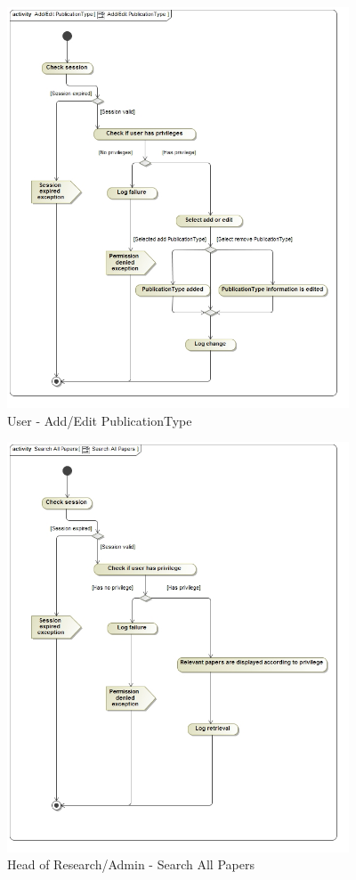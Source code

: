 \documentclass{article}
\begin{document}
			\begin{figure}[H]
				\includegraphics[width=4in, center]{../Diagrams/Process Specifications/Publication subsystem/Add_Edit PublicationType.jpg}
				\caption{User - Add/Edit PublicationType}
			\end{figure}
			\begin{figure}[H]
				\includegraphics[width=4in, center]{../Diagrams/Process Specifications/Publication subsystem/Search All Papers.jpg}
				\caption{Head of Research/Admin - Search All Papers}
			\end{figure}
\end{document}

